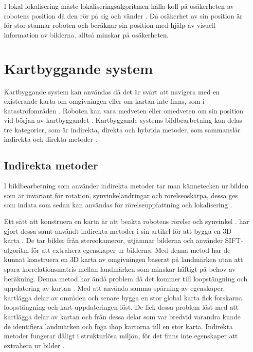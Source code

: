I lokal lokalisering måste lokaliseringsalgoritmen hålla koll på osäkerheten av robotens position då den rör på sig och vänder \citep{772544}. Då osäkerhet av sin position är för stor stannar roboten och beräknar sin position med hjälp av visuell information av bilderna, alltså minskar på osäkerheten.

\section{Kartbyggande system}

Kartbyggande system kan användas då det är svårt att navigera med en existerande karta om omgivningen eller om kartan inte finns, som i katastrofområden \citep{geospatial}. Roboten kan vara medveten eller omedveten om sin position vid början av kartbyggandet \citep{globalsubmaps}. Kartbyggande systems bildbearbetning kan delas tre kategorier, som är indirekta, direkta och hybrida metoder, som sammanslår indirekta och direkta metoder \citep{geospatial}.

\subsection{Indirekta metoder}

I bildbearbetning som använder indirekta metoder tar man kännetecken ur bilden som är invariant för rotation, synvinkeländringar och rörelseoskärpa, dessa ges som indata som sedan kan användas för rörelseuppfattning och lokalisering \citep{geospatial}. 

Ett sätt att konstruera en karta är att beakta robotens rörelse och synvinkel \citep{globalsubmaps}. \cite{mapbuildingsift} har gjort dessa samt användt indirekta metoder i sin artikel  för att bygga en 3D-karta \citep{mapbuildingsift}. De tar bilder från stereokameror, utjämnar bilderna och använder SIFT-algoritm för att extrahera egenskaper ur bilderna. Med denna metod har de kunnat konstruera en 3D karta av omgivningen baserat på landmärken utan att spara korrelationsmatris mellan landmärken som minskar häftigt på behov av beräkning. Denna metod har ändå problem då det kommer till loopstängning och uppdatering av kartan \citep{globalsubmaps}. Med att använda samma spårning av egenskaper, kartlägga delar av områden och senare bygga en stor global karta fick forskarna loopstängning och kart-uppdateringen löst. De fick dessa problem löst med att kartlägga delar av kartan och från dessa delar som var bredvid varandra kunde de identifiera landmärken och foga ihop kartorna till en stor karta. Indirekta metoder fungerar dåligt i strukturlösa miljön, för det finns inte egenskaper att extrahera ur bilder \citep{geospatial}.

